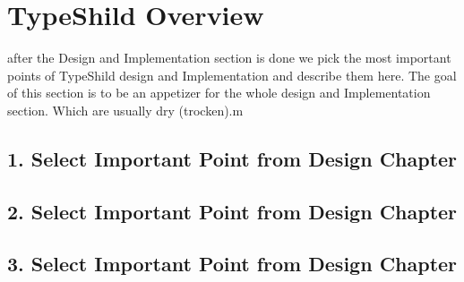 \chapter{TypeShild Overview}
\label{chapter:TypeShild Overview}

after the Design and Implementation section is done
we pick the most important points of TypeShild design and Implementation and describe them here.
The goal of this section is to be an appetizer for the whole design and Implementation section.
Which are usually dry (trocken).m

\section{1. Select Important Point from Design Chapter}
\section{2. Select Important Point from Design Chapter}
\section{3. Select Important Point from Design Chapter}